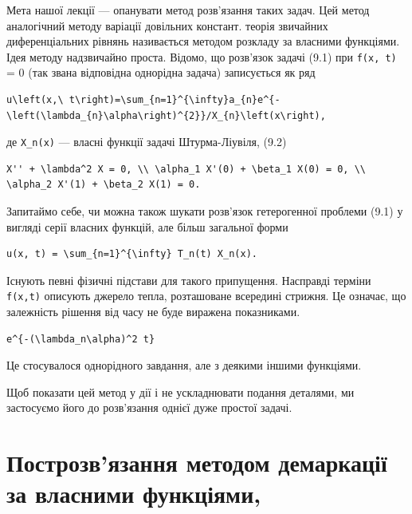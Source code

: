 \documentclass[
  ukrainian,
]{article}
\begin{document}
Мета нашої лекції --- опанувати метод розв'язання таких задач. Цей метод
аналогічний методу варіації довільних констант. теорія звичайних
диференціальних рівнянь називається методом розкладу за власними
функціями. Ідея методу надзвичайно проста. Відомо, що розв'язок задачі
(9.1) при \texttt{f(x,\ t)} = 0 (так звана відповідна однорідна задача)
записується як ряд

\begin{verbatim}
u\left(x,\ t\right)=\sum_{n=1}^{\infty}a_{n}e^{-\left(\lambda_{n}\alpha\right)^{2}}/X_{n}\left(x\right),
\end{verbatim}

де \texttt{X\_n(x)} --- власні функції задачі Штурма-Ліувіля, (9.2)

\begin{verbatim}
X'' + \lambda^2 X = 0, \\ \alpha_1 X'(0) + \beta_1 X(0) = 0, \\ \alpha_2 X'(1) + \beta_2 X(1) = 0.
\end{verbatim}

Запитаймо себе, чи можна також шукати розв'язок гетерогенної проблеми
(9.1) у вигляді серії власних функцій, але більш загальної форми

\begin{verbatim}
u(x, t) = \sum_{n=1}^{\infty} T_n(t) X_n(x).
\end{verbatim}

Існують певні фізичні підстави для такого припущення. Насправді терміни
\texttt{f(x,t)} описують джерело тепла, розташоване всередині стрижня.
Це означає, що залежність рішення від часу не буде виражена показниками.

\begin{verbatim}
e^{-(\lambda_n\alpha)^2 t}
\end{verbatim}

Це стосувалося однорідного завдання, але з деякими іншими функціями.

Щоб показати цей метод у дії і не ускладнювати подання деталями, ми
застосуємо його до розв'язання однієї дуже простої задачі.

\section{Построзв'язання методом демаркації за власними
функціями,}\label{ux43fux43eux441ux442ux440ux43eux437ux432ux44fux437ux430ux43dux43dux44f-ux43cux435ux442ux43eux434ux43eux43c-ux434ux435ux43cux430ux440ux43aux430ux446ux456ux457-ux437ux430-ux432ux43bux430ux441ux43dux438ux43cux438-ux444ux443ux43dux43aux446ux456ux44fux43cux438}
\end{document}
